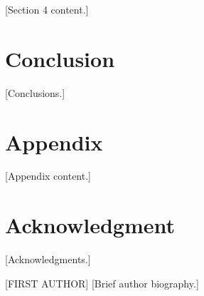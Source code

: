 \documentclass[journal]{IEEEtran}
\begin{document}
[Section 4 content.]


\section{Conclusion}
\label{sec:conclusion}

[Conclusions.]


\appendices
\section{Appendix}
[Appendix content.]


\section*{Acknowledgment}

[Acknowledgments.]




\begin{IEEEbiographynophoto}{[FIRST AUTHOR]}
[Brief author biography.]
\end{IEEEbiographynophoto}
\end{document}
